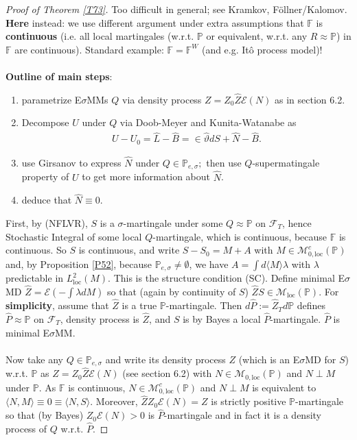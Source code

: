 \documentclass[12pt,a4paper, twoside]{article}
\theoremstyle{definition}
\newcommand{\PP}{\mathbb{P}} %
\begin{document}
\begin{proof}[Proof of Theorem \ref{T73}] Too difficult in general; see Kramkov, Föllner/Kalomov. \textbf{Here} instead: we use different argument under extra assumptions that $\mathbb{F}$ is \textbf{continuous} (i.e. all local martingales (w.r.t. $\PP$ or equivalent, w.r.t. any $R \approx \PP$) in $\mathbb{F}$ are continuous). Standard example: $\mathbb{F}= \mathbb{F}^W$ (and e.g. Itô process model)!
\\\\
\textbf{Outline of main steps}:
\begin{enumerate}[label=(\alph*)]
\item parametrize E$\sigma$MMs $Q$ via density process $Z=Z_0 \hat{Z} \mathcal{E}(N)$ as in section 6.2.
\item Decompose $U$ under $Q$ via Doob-Meyer and Kunita-Watanabe as 
\begin{align*}
U-U_0 = \hat{L}- \hat{B} = \in \hat{\vartheta} dS + \hat{N} - \hat{B}.
\end{align*}
\item use Girsanov to express $\hat{N}$ under $Q \in \PP_{e, \sigma};$ then use $Q$-supermatingale property of $U$ to get more information about $\hat{N}$.
\item deduce that $\hat{N} \equiv 0$. 
\end{enumerate}
First, by (NFLVR), $S$ is a $\sigma$-martingale under some $Q \approx \PP$ on $\mathcal{F}_T$, hence Stochastic Integral of some local $Q$-martingale, which is continuous, because $\mathbb{F}$ is continuous. So $S$ is continuous, and write $S-S_0 = M + A$ with $M \in \mathcal{M}_{0, \text{loc}}^c( \PP)$ and, by Proposition \ref{P52}, because $\PP_{e, \sigma} \neq \emptyset$, we have $A = \int d \langle M \rangle \lambda$ with $\lambda$ predictable in $L_\text{loc}^2(M)$. This is the structure condition (SC).
\newpage
Define minimal E$\sigma$MD $\hat{Z}= \mathcal{E}(- \int \lambda dM)$ so that (again by continuity of $S$) $\hat{Z}S \in \mathcal{M}_\text{loc}( \PP)$. For \textbf{simplicity}, assume that $\hat{Z}$ is a true $\PP$-martingale. Then $d \hat{P}:= \hat{Z}_T d \PP$ defines $\hat{P} \approx \PP$ on $\mathcal{F}_T$, density process is $\hat{Z}$, and $S$ is by Bayes a local $\hat{P}$-martingale. $\hat{P}$ is minimal E$\sigma$MM.   
\\\\
Now take any $Q \in \PP_{e, \sigma}$ and write its density process $Z$ (which is an E$\sigma$MD for $S$) w.r.t. $\PP$ as $Z= Z_0 \hat{Z} \mathcal{E}(N)$ (see section 6.2) with $N \in \mathcal{M}_{0, \text{loc}}( \PP)$ and $N \perp M$ under $\PP$. As $\mathbb{F}$ is continuous, $N \in \mathcal{M}_{0, \text{loc}}^c( \PP)$ and $N \perp M$ is equivalent to $\langle N, M \rangle \equiv 0 \equiv \langle N, S\rangle.$  Moreover, $\hat{Z} Z_0 \mathcal{E}(N) = Z$ is strictly positive $\PP$-martingale so that (by Bayes) $Z_0 \mathcal{E}(N) >0$ is $\hat{P}$-martingale and in fact it is a density process of $Q$ w.r.t. $\hat{P}$. 

\end{proof}
\end{document}
